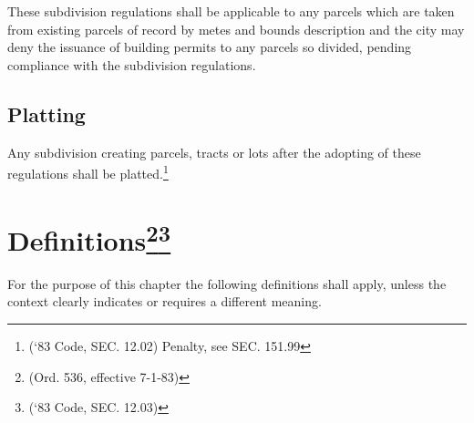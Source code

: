 \subsubsection{}
These subdivision regulations shall be applicable to any parcels which are taken from existing parcels of record by metes and bounds description and the city may deny the issuance of building permits to any parcels so divided, pending compliance with the subdivision regulations.
\subsection{Platting}
Any subdivision creating parcels, tracts or lots after the adopting of these regulations shall be platted.\footnote{(‘83 Code, SEC. 12.02)  Penalty, see SEC. 151.99}

\section{Definitions\footnote{(Ord. 536, effective 7-1-83)}\footnote{(‘83 Code, SEC. 12.03)}}
For the purpose of this chapter the following definitions shall apply, unless the context clearly indicates or requires a different meaning.
